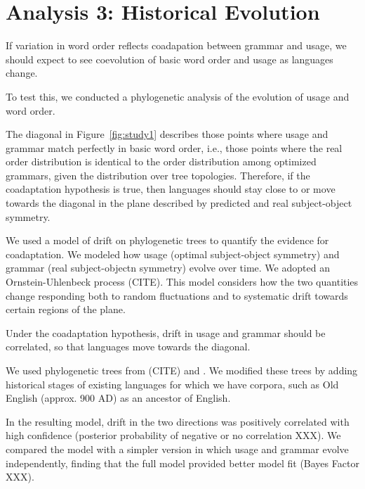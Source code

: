 \documentclass[11pt,a4paper]{article}
\begin{document}
\section{Analysis 3: Historical Evolution}


If variation in word order reflects coadapation between grammar and usage, we should expect to see coevolution of basic word order and usage as languages change.

To test this, we conducted a phylogenetic analysis of the evolution of usage and word order.




The diagonal in Figure~\ref{fig:study1} describes those points where usage and grammar match perfectly in basic word order, i.e., those points where the real order distribution is identical to the order distribution among optimized grammars, given the distribution over tree topologies.
Therefore, if the coadaptation hypothesis is true, then languages should stay close to or move towards the diagonal in the plane described by predicted and real subject-object symmetry.



We used a model of drift on phylogenetic trees to quantify the evidence for coadaptation.
We modeled how usage (optimal subject-object symmetry) and grammar (real subject-objectn symmetry) evolve over time.
We adopted an Ornstein-Uhlenbeck process (CITE).
This model considers how the two quantities change responding both to random fluctuations and to systematic drift towards certain regions of the plane.

Under the coadaptation hypothesis, drift in usage and grammar should be correlated, so that languages move towards the diagonal.


We used phylogenetic trees from (CITE) and .
We modified these trees by adding historical stages of existing languages for which we have corpora, such as Old English (approx. 900 AD) as an ancestor of English.


In the resulting model, drift in the two directions was positively correlated with high confidence (posterior probability of negative or no correlation XXX).
We compared the model with a simpler version in which usage and grammar evolve independently, finding that the full model provided better model fit (Bayes Factor XXX).
\end{document}
